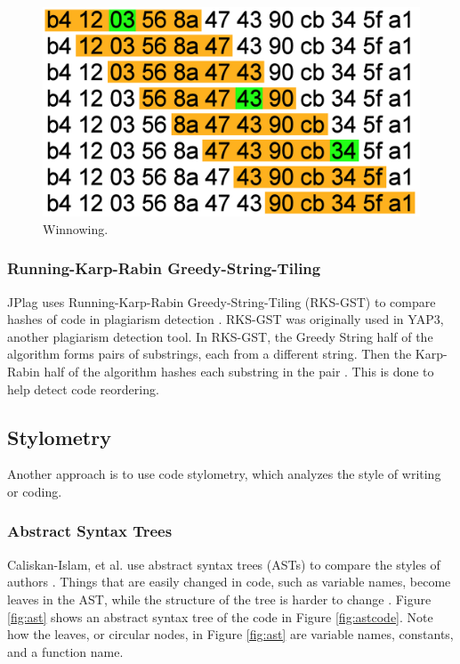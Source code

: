 \documentclass[12pt]{article}
\begin{document}
				\begin{figure}[h!]
					\includegraphics[scale=0.75]{Winnowing.png}
					\caption{Winnowing.}
					\label{fig:winnowing1}
				\end{figure}
			
			\subsubsection{Running-Karp-Rabin Greedy-String-Tiling}
				JPlag uses Running-Karp-Rabin Greedy-String-Tiling (RKS-GST) to compare hashes of code in plagiarism detection \cite{prechelt+malpohl+philippsen}. RKS-GST was originally used in YAP3, another plagiarism detection tool. In RKS-GST, the Greedy String half of the algorithm forms pairs of substrings, each from a different string. Then the Karp-Rabin half of the algorithm hashes each substring in the pair \cite{wise}. This is done to help detect code reordering.
		
		\subsection{Stylometry}
			Another approach is to use code stylometry, which analyzes the style of writing or coding.
			
			\subsubsection{Abstract Syntax Trees}
				Caliskan-Islam, et al. use abstract syntax trees (ASTs) to compare the styles of authors \cite{caliskan-islam+harang+liu}. Things that are easily changed in code, such as variable names, become leaves in the AST, while the structure of the tree is harder to change \cite{caliskan-islam+harang+liu}. Figure \ref{fig:ast} shows an abstract syntax tree of the code in Figure \ref{fig:astcode}. Note how the leaves, or circular nodes, in Figure \ref{fig:ast} are variable names, constants, and a function name.
				
\end{document}
